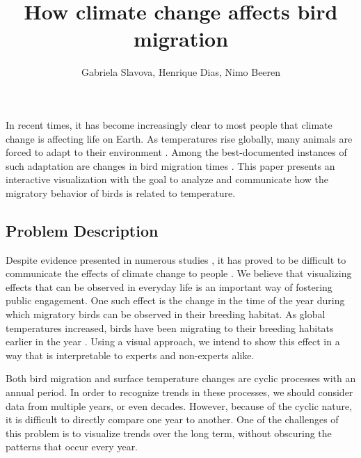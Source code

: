 \documentclass[journal]{vgtc}                %
\title{How climate change affects bird migration}
\author{Gabriela Slavova, Henrique Dias, Nimo Beeren}
\begin{document}


\maketitle

In recent times, it has become increasingly clear to most people that climate change is affecting life on Earth. As temperatures rise globally, many animals are forced to adapt to their environment \cite{parmesan2007pheno,gaughan2009domestic,root2003fingerprints}. Among the best-documented instances of such adaptation are changes in bird migration times \cite{miller2008bird,visser2008climate,jenni2003timing}. This paper presents an interactive visualization with the goal to analyze and communicate how the migratory behavior of birds is related to temperature.

\subsection{Problem Description}

Despite evidence presented in numerous studies \cite{solomon2007climate,parry2007climate}, it has proved to be difficult to communicate the effects of climate change to people \cite{lee2015predictors,brulle2012shifting,moser2011communicating}. We believe that visualizing effects that can be observed in everyday life is an important way of fostering public engagement. One such effect is the change in the time of the year during which migratory birds can be observed in their breeding habitat. As global temperatures increased, birds have been migrating to their breeding habitats earlier in the year \cite{cotton2003avian,marra2005influence,jenni2003timing}. Using a visual approach, we intend to show this effect in a way that is interpretable to experts and non-experts alike.

Both bird migration and surface temperature changes are cyclic processes with an annual period. In order to recognize trends in these processes, we should consider data from multiple years, or even decades. However, because of the cyclic nature, it is difficult to directly compare one year to another. One of the challenges of this problem is to visualize trends over the long term, without obscuring the patterns that occur every year.
\end{document}
